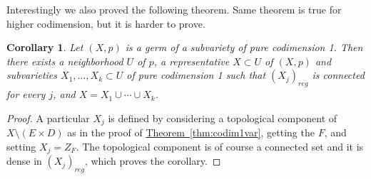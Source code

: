 \documentclass[12pt,openany]{book}
\theoremstyle{plain}
\newtheorem{cor}[thm]{Corollary}
\theoremstyle{remark}
\theoremstyle{definition}
\theoremstyle{exercise}
\theoremstyle{example}
\newcommand{\thmref}[1]{\hyperref[#1]{Theorem~\ref*{#1}}}
\begin{document}
Interestingly we also proved the following theorem.  Same theorem is true
for higher codimension, but it is harder to prove.

\begin{cor}
Let $(X,p)$ is a germ of a subvariety of pure codimension 1.  Then there exists
a neighborhood $U$ of $p$, a representative $X \subset U$ of $(X,p)$
and subvarieties $X_1,\ldots,X_k \subset U$
of pure codimension 1 such that $(X_j)_{\mathit{reg}}$ is connected for
every $j$, and
$X = X_1 \cup \cdots \cup X_k$.
\end{cor}

\begin{proof}
A particular $X_j$ is defined by considering a topological component of $X \setminus
(E \times D)$ as in the proof of \thmref{thm:codim1var}, getting the $F$,
and setting $X_j = Z_F$.
The topological component is of course a connected set and it is dense in
$(X_j)_{\mathit{reg}}$, which proves the corollary.
\end{proof}
\end{document}

